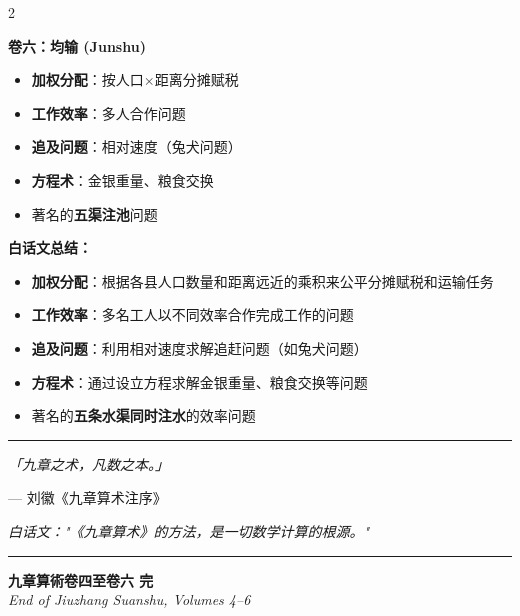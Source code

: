 \documentclass[11pt,a4paper]{article}
\newcommand{\shortline}{\noindent\rule{0.5\textwidth}{0.4pt}\par}
\begin{document}
\vspace{0.5cm}

\begin{paracol}{2}

\textbf{卷六：均输 (Junshu)}

\begin{itemize}[leftmargin=1.5em]
  \item \textbf{加权分配}：按人口$\times$距离分摊赋税
  \item \textbf{工作效率}：多人合作问题
  \item \textbf{追及问题}：相对速度（兔犬问题）
  \item \textbf{方程术}：金银重量、粮食交换
  \item 著名的\textbf{五渠注池}问题
\end{itemize}

\switchcolumn

\textbf{白话文总结：}

\begin{itemize}[leftmargin=1.5em]
  \item \textbf{加权分配}：根据各县人口数量和距离远近的乘积来公平分摊赋税和运输任务
  \item \textbf{工作效率}：多名工人以不同效率合作完成工作的问题
  \item \textbf{追及问题}：利用相对速度求解追赶问题（如兔犬问题）
  \item \textbf{方程术}：通过设立方程求解金银重量、粮食交换等问题
  \item 著名的\textbf{五条水渠同时注水}的效率问题
\end{itemize}

\end{paracol}

\vspace{1cm}

\begin{center}
\shortline
\vspace{0.5cm}

\textit{「九章之术，凡数之本。」}
\vspace{0.3em}

--- 刘徽《九章算术注序》

\vspace{0.3cm}

\textit{白话文："《九章算术》的方法，是一切数学计算的根源。"}

\vspace{0.5cm}
\shortline
\end{center}

\vspace{1cm}

\begin{center}
\textbf{九章算術卷四至卷六 完}\\[0.5em]
\textit{End of Jiuzhang Suanshu, Volumes 4--6}
\end{center}
\end{document}
